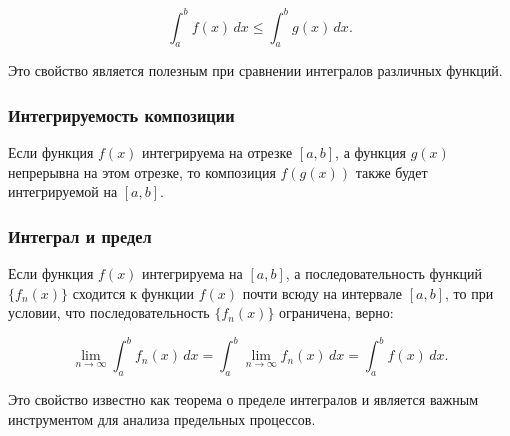 \[ \int_a^b f(x) \, dx \leq \int_a^b g(x) \, dx.  \]

Это свойство является полезным при сравнении интегралов различных функций.

\subsubsection{Интегрируемость композиции}

Если функция \( f(x) \) интегрируема на отрезке \( [a, b] \), а функция \( g(x)
\) непрерывна на этом отрезке, то композиция \( f(g(x)) \) также будет
интегрируемой на \( [a, b] \).

\subsubsection{Интеграл и предел}

Если функция \( f(x) \) интегрируема на \( [a, b] \), а последовательность
функций \( \{ f_n(x) \} \) сходится к функции \( f(x) \) почти всюду на
интервале \( [a, b] \), то при условии, что последовательность \( \{ f_n(x) \}
\) ограничена, верно:

\[ \lim_{n \to \infty} \int_a^b f_n(x) \, dx = \int_a^b \lim_{n \to \infty}
f_n(x) \, dx = \int_a^b f(x) \, dx.  \]

Это свойство известно как теорема о пределе интегралов и является важным
инструментом для анализа предельных процессов.
